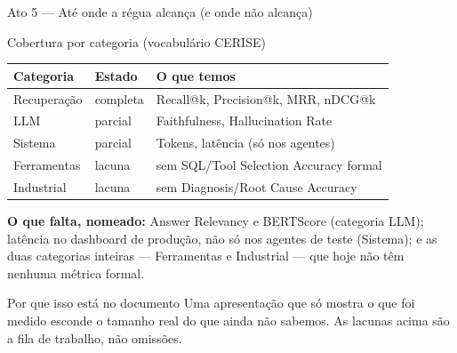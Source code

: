 \documentclass{beamer}
\newenvironment{numerobloco}[1]{\begin{block}{#1}}{\end{block}}
\newenvironment{decisaobloco}[1]{\begin{alertblock}{#1}}{\end{alertblock}}
\begin{document}
\begin{frame}{Ato 5 --- Até onde a régua alcança (e onde não alcança)}
  \small
  \begin{numerobloco}{Cobertura por categoria (vocabulário CERISE)}
    \begin{center}
    \begin{tabular}{lll}
      \toprule
      \textbf{Categoria} & \textbf{Estado} & \textbf{O que temos} \\
      \midrule
      Recuperação & \textcolor{ceriseroxo}{completa} & Recall@k, Precision@k, MRR, nDCG@k \\
      LLM         & parcial & Faithfulness, Hallucination Rate \\
      Sistema     & parcial & Tokens, latência (só nos agentes) \\
      Ferramentas & \alert{lacuna} & sem SQL/Tool Selection Accuracy formal \\
      Industrial  & \alert{lacuna} & sem Diagnosis/Root Cause Accuracy \\
      \bottomrule
    \end{tabular}
    \end{center}
  \end{numerobloco}

  \pause
  \textbf{O que falta, nomeado:} Answer Relevancy e BERTScore (categoria LLM); latência no
  dashboard de produção, não só nos agentes de teste (Sistema); e as duas categorias
  inteiras --- Ferramentas e Industrial --- que hoje não têm nenhuma métrica formal.

  \pause
  \begin{decisaobloco}{Por que isso está no documento}
    Uma apresentação que só mostra o que foi medido esconde o tamanho real do que ainda
    não sabemos. As lacunas acima são a fila de trabalho, não omissões.
  \end{decisaobloco}
\end{frame}
\end{document}
